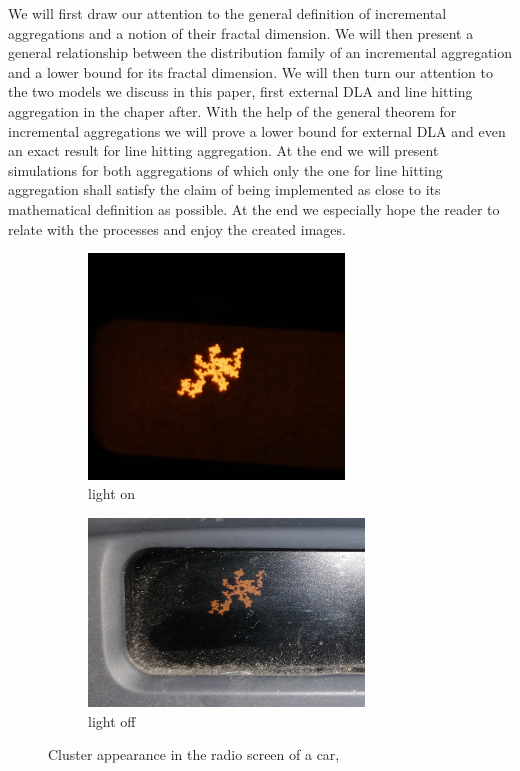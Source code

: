 \documentclass[12pt,a4paper]{scrartcl}
\newcommand{\1}{\mathbbm{1}}
\theoremstyle{definition}
\numberwithin{equation}{section}
\begin{document}
	\noindent We will first draw our attention to the general definition of incremental aggregations and a notion of their fractal dimension. We will then present a general relationship between the distribution family of an incremental aggregation and a lower bound for its fractal dimension. We will then turn our attention to the two models we discuss in this paper, first external DLA and line hitting aggregation in the chaper after. With the help of the general theorem for incremental aggregations we will prove a lower bound for external DLA and even an exact result for line hitting aggregation. At the end we will present simulations for both aggregations of which only the one for line hitting aggregation shall satisfy the claim of being implemented as close to its mathematical definition as possible. At the end we especially hope the reader to relate with the processes and enjoy the created images.
	
\begin{figure}[p]
	\centering
	\begin{subfigure}[b]{.47\textwidth}
		\includegraphics[height=6cm]{images/display.jpg} 
		\caption{light on} 
	\end{subfigure}
	\begin{subfigure}[b]{.47\textwidth}
		\includegraphics[height=5cm]{images/display2.jpg}
		\caption{light off} 
	\end{subfigure}
	\caption{Cluster appearance in the radio screen of a car, \cite{own}}
	\label{radio}
\end{figure}
\end{document}
